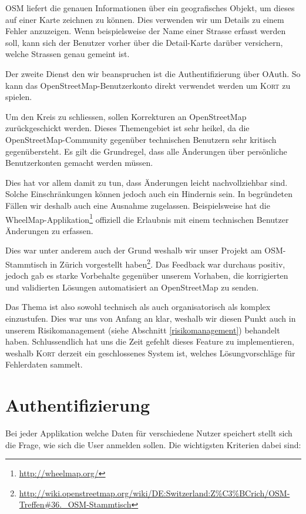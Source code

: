 OSM liefert die genauen Informationen über ein geografisches Objekt, um dieses auf einer Karte zeichnen zu können.
Dies verwenden wir um Details zu einem Fehler anzuzeigen.
Wenn beispielsweise der Name einer Strasse erfasst werden soll, kann sich der Benutzer vorher über die Detail-Karte darüber versichern, welche Strassen genau gemeint ist.

Der zweite Dienst den wir beanspruchen ist die Authentifizierung über \gls{OAuth}.
So kann das OpenStreetMap-Benutzerkonto direkt verwendet werden um \textsc{Kort} zu spielen.

Um den Kreis zu schliessen, sollen Korrekturen an OpenStreetMap zurückgeschickt werden.
Dieses Themengebiet ist sehr heikel, da die OpenStreetMap-Community gegenüber technischen Benutzern sehr kritisch gegenübersteht.
Es gilt die Grundregel, dass alle Änderungen über persönliche Benutzerkonten gemacht werden müssen.

Dies hat vor allem damit zu tun, dass Änderungen leicht nachvollziehbar sind.
Solche Einschränkungen können jedoch auch ein Hindernis sein.
In begründeten Fällen wir deshalb auch eine Ausnahme zugelassen.
Beispielsweise hat die WheelMap-Applikation\footnote{\url{http://wheelmap.org/}} offiziell die Erlaubnis mit einem technischen Benutzer Änderungen zu erfassen.

Dies war unter anderem auch der Grund weshalb wir unser Projekt am OSM-Stammtisch in Zürich vorgestellt haben\footnote{\url{http://wiki.openstreetmap.org/wiki/DE:Switzerland:Z\%C3\%BCrich/OSM-Treffen\#36._OSM-Stammtisch}}.
Das Feedback war durchaus positiv, jedoch gab es starke Vorbehalte gegenüber unserem Vorhaben, die korrigierten und validierten Lösungen automatisiert an OpenStreetMap zu senden.

Das Thema ist also sowohl technisch als auch organisatorisch als komplex einzustufen.
Dies war uns von Anfang an klar, weshalb wir diesen Punkt auch in unserem Risikomanagement (siehe Abschnitt \ref{risikomanagement}) behandelt haben.
Schlussendlich hat uns die Zeit gefehlt dieses Feature zu implementieren, weshalb \textsc{Kort} derzeit ein geschlossenes System ist, welches Lösungvorschläge für Fehlerdaten sammelt.

\section{Authentifizierung}
Bei jeder Applikation welche Daten für verschiedene Nutzer speichert stellt sich die Frage, wie sich die User anmelden sollen.
Die wichtigsten Kriterien dabei sind:

